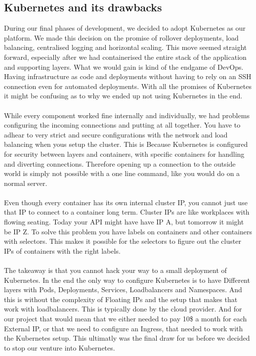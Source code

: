 \documentclass[12pt]{article}
\begin{document}
\subsection{Kubernetes and its drawbacks}
During our final phases of development, we decided to adopt Kubernetes as our platform. We made this decision on the promise of rollover deployments, load balancing, centralised logging and horizontal scaling. This move seemed straight forward, especially after we had containerised the entire stack of the application and supporting layers. What we would gain is kind of the endgame of DevOps. Having infrastructure as code and deployments without having to rely on an SSH connection even for automated deployments. With all the promises of Kubernetes it might be confusing as to why we ended up not using Kubernetes in the end.
\\\\
While every component worked fine internally and individually, we had problems configuring the incoming connections and putting at all together. You have to adhear to very strict and secure configurations with the network and load balancing when yous setup the cluster. This is Because Kubernetes is configured for security between layers and containers, with specific containers for handling and diverting connections. Therefore opening up a connection to the outside world is simply not possible with a one line command, like you would do on a normal server.
\\\\
Even though every container has its own internal cluster IP, you cannot just use that IP to connect to a container long term. Cluster IPs are like workplaces with flowing seating. Today your API might have have IP A, but tomorrow it might be IP Z. To solve this problem you have labels on containers and other containers with selectors. This makes it possible for the selectors to figure out the cluster IPs of containers with the right labels. 
\\\\
The takeaway is that you cannot hack your way to a small deployment of Kubernetes. In the end the only way to configure Kubernetes is to have Different layers with Pods, Deployments, Services, Loadbalancers and Namespaces. And this is without the complexity of Floating IPs and the setup that makes that work with loadbalancers. This is typically done by the cloud provider. And for our project that would mean that we either needed to pay 10\$ a month for each External IP, or that we need to configure an Ingress, that needed to work with the Kubernetes setup. This ultimatly was the final draw for us before we decided to stop our venture into Kubernetes.   
\end{document}

